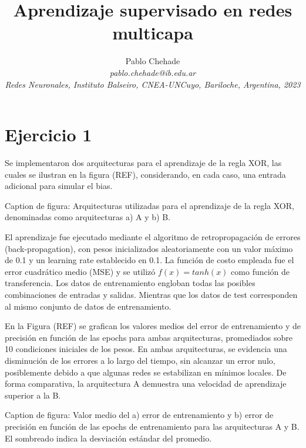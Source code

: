 \documentclass[aps,prb,twocolumn,superscriptaddress,floatfix,longbibliography]{revtex4-2}
\newcounter{para}
\begin{document}
\newcommand{\mytitle}{Aprendizaje supervisado en redes multicapa}

\title{\mytitle}

\author{Pablo Chehade \\
    \small \textit{pablo.chehade@ib.edu.ar} \\
    \small \textit{Redes Neuronales, Instituto Balseiro, CNEA-UNCuyo, Bariloche, Argentina, 2023} \\}
    
\maketitle

\section*{Ejercicio 1}

Se implementaron dos arquitecturas para el aprendizaje de la regla XOR, las cuales se ilustran en la figura (REF), considerando, en cada caso, una entrada adicional para simular el bias.

Caption de figura: Arquitecturas utilizadas para el aprendizaje de la regla XOR, denominadas como arquitecturas a) A y b) B.

El aprendizaje fue ejecutado mediante el algoritmo de retropropagación de errores (back-propagation), con pesos inicializados aleatoriamente con un valor máximo de 0.1 y un learning rate establecido en 0.1. La función de costo empleada fue el error cuadrático medio (MSE) y se utilizó $f(x) = tanh(x)$ como función de transferencia. Los datos de entrenamiento engloban todas las posibles combinaciones de entradas y salidas. Mientras que los datos de test corresponden al mismo conjunto de datos de entrenamiento.

En la Figura (REF) se grafican los valores medios del error de entrenamiento y de precisión en función de las epochs para ambas arquitecturas, promediados sobre 10 condiciones iniciales de los pesos. En ambas arquitecturas, se evidencia una disminución de los errores a lo largo del tiempo, sin alcanzar un error nulo, posiblemente debido a que algunas redes se estabilizan en mínimos locales. De forma comparativa, la arquitectura A demuestra una velocidad de aprendizaje superior a la B.

Caption de figura: Valor medio del a) error de entrenamiento y b) error de precisión en función de las epochs de entrenamiento para las arquitecturas A y B. El sombreado indica la desviación estándar del promedio.
\end{document}
